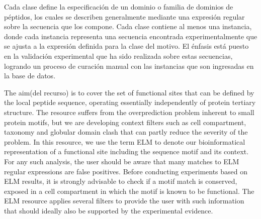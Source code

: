 Cada clase define la especificación de un dominio o familia de dominios de péptidos, los cuales se describen generalmente mediante una expresión regular sobre la secuencia que los compone.
Cada clase contiene al menos una instancia, donde cada instancia representa una secuencia encontrada experimentalmente que se ajusta a la expresión definida para la clase del motivo.
El énfasis está puesto en la validación experimental que ha sido realizada sobre estas secuencias, logrando un proceso de curación manual con las instancias que son ingresadas en la base de datos. 


The aim(del recurso) is to cover the set of functional sites that can be defined by the local peptide sequence, operating essentially independently of protein tertiary structure. 
The resource suffers from the overprediction problem inherent to small protein motifs, but we are developing context filters such as cell compartment, taxonomy and globular domain clash that can partly reduce the severity
of the problem. In this resource, we use the term ELM to denote our bioinformatical representation of a functional site including the sequence motif and its context.
For any such analysis, the user should be aware that many matches to ELM regular expressions are false positives. 
Before conducting experiments based on ELM results, it is strongly advisable to check if a motif match is conserved, exposed in a cell compartment in which the motif is known to be functional. 
The ELM resource applies several filters to provide the user with such information that should ideally also be supported by the experimental evidence.


